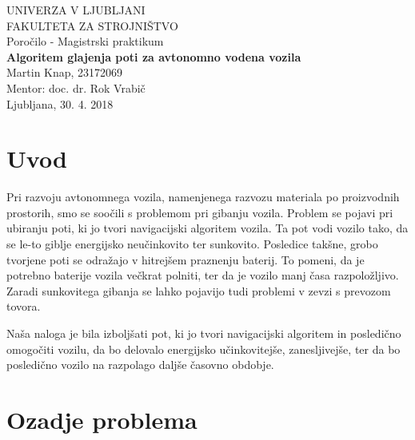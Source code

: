 \documentclass[10pt,a4paper]{article}
\begin{document}
\begin{titlepage}
	\begin{center}
		\large UNIVERZA V LJUBLJANI
		\\[1cm]
		\large FAKULTETA ZA STROJNIŠTVO
		\\[5cm]
		\large Poročilo - Magistrski praktikum
		\\[0.5cm]
		\Large\textbf{Algoritem glajenja poti za avtonomno vodena vozila}
		\\[4cm]
		Martin Knap, 23172069
		\\[0.5cm]
		Mentor: doc. dr. Rok Vrabič
		\\[5cm]
		Ljubljana, 30. 4. 2018
	\end{center}
\end{titlepage}

\tableofcontents
\listoffigures
\clearpage


\section{Uvod}

Pri razvoju avtonomnega vozila, namenjenega razvozu materiala po proizvodnih prostorih, smo se soočili s problemom pri gibanju vozila. Problem se pojavi pri ubiranju poti, ki jo tvori navigacijski algoritem vozila. Ta pot vodi vozilo tako, da se le-to giblje energijsko neučinkovito ter sunkovito. Posledice takšne, grobo tvorjene poti se odražajo v hitrejšem praznenju baterij. To pomeni, da je potrebno baterije vozila večkrat polniti, ter da je vozilo manj časa razpoložljivo. Zaradi sunkovitega gibanja se lahko pojavijo tudi problemi v zevzi s prevozom tovora. %

Naša naloga je bila izboljšati pot, ki jo tvori navigacijski algoritem in posledično omogočiti vozilu, da bo delovalo energijsko učinkovitejše, zanesljivejše, ter da bo posledično vozilo na razpolago daljše časovno obdobje.

\section{Ozadje problema}
\end{document}
